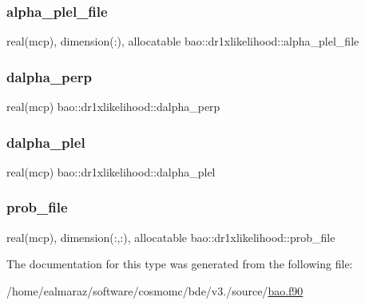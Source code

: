 \subsubsection{\texorpdfstring{alpha\+\_\+plel\+\_\+file}{alpha\_plel\_file}}
{\footnotesize\ttfamily real(mcp), dimension(\+:), allocatable bao\+::dr1xlikelihood\+::alpha\+\_\+plel\+\_\+file\hspace{0.3cm}{\ttfamily [private]}}

\mbox{\label{structbao_1_1dr1xlikelihood_a12b13a353ca6725ca408c9c0fe7f06fc}} 
\subsubsection{\texorpdfstring{dalpha\+\_\+perp}{dalpha\_perp}}
{\footnotesize\ttfamily real(mcp) bao\+::dr1xlikelihood\+::dalpha\+\_\+perp\hspace{0.3cm}{\ttfamily [private]}}

\mbox{\label{structbao_1_1dr1xlikelihood_a98e51dafd2121274f06ad9f67b9eecf0}} 
\subsubsection{\texorpdfstring{dalpha\+\_\+plel}{dalpha\_plel}}
{\footnotesize\ttfamily real(mcp) bao\+::dr1xlikelihood\+::dalpha\+\_\+plel\hspace{0.3cm}{\ttfamily [private]}}

\mbox{\label{structbao_1_1dr1xlikelihood_ac71d018f2f85f725fd96f36aba612d55}} 
\subsubsection{\texorpdfstring{prob\+\_\+file}{prob\_file}}
{\footnotesize\ttfamily real(mcp), dimension(\+:,\+:), allocatable bao\+::dr1xlikelihood\+::prob\+\_\+file\hspace{0.3cm}{\ttfamily [private]}}



The documentation for this type was generated from the following file\+:\begin{DoxyCompactItemize}
\item 
/home/ealmaraz/software/cosmomc/bde/v3./source/\mbox{\hyperlink{bao_8f90}{bao.\+f90}}\end{DoxyCompactItemize}
